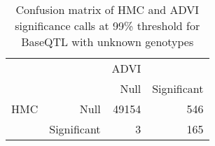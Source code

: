 \begin{table}[ht]
\centering
\begin{tabular}{rr|rr}
   &  & ADVI &  \\ 
    &   & Null & Significant \\ 
   \hline
HMC & Null & 49154 & 546 \\ 
    & Significant & 3 & 165 \\ 
  \end{tabular}
\caption{Confusion matrix of HMC and ADVI significance calls at 99\% threshold for BaseQTL with unknown genotypes} 
\label{tab:nogt-xtab-99}
\end{table}
